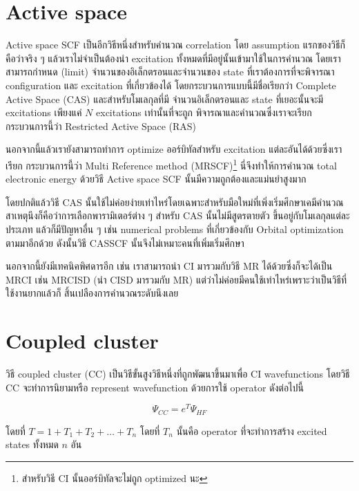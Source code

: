 \section{Active space}

Active space SCF เป็นอีกวิธีหนึ่งสำหรับคำนวณ correlation โดย assumption แรกของวิธีก็คือว่าจริง ๆ 
แล้วเราไม่จำเป็นต้องนำ excitation ทั้งหมดที่มีอยู่นั้นเข้ามาใช้ในการคำนวณ โดยเราสามารถกำหนด (limit) 
จำนวนของอิเล็กตรอนและจำนวนของ state ที่เราต้องการที่จะพิจารณา configuration และ excitation 
ที่เกี่ยวข้องได้ โดยกระบวนการแบบนี้มีชื่อเรียกว่า Complete Active Space (CAS) และสำหรับโมเลกุลที่มี%
จำนวนอิเล็กตรอนและ state ที่เยอะนั้นจะมี excitations เพียงแค่ $N$ excitations เท่านั้นที่จะถูก%
พิจารณาและคำนวณซึ่งเราจะเรียกกระบวนการนี้ว่า Restricted Active Space (RAS)

นอกจากนี้แล้วเรายังสามารถทำการ optimize ออร์บิทัลสำหรับ excitation แต่ละอันได้ด้วยซึ่งเราเรียก%
กระบวนการนี้ว่า Multi Reference method (MRSCF)\footnote{สำหรับวิธี CI นั้นออร์บิทัลจะไม่ถูก 
optimized นะ} นี่จึงทำให้การคำนวณ total electronic energy ด้วยวิธี Active space SCF 
นั้นมีความถูกต้องและแม่นยำสูงมาก

โดยปกติแล้ววิธี CAS นั้นใช้ไม่ค่อยง่ายเท่าไหร่โดยเฉพาะสำหรับมือใหม่ที่เพิ่งเริ่มศึกษาเคมีคำนวณ 
สาเหตุนึงก็คือว่าการเลือกพารามิเตอร์ต่าง ๆ สำหรับ CAS นั้นไม่มีสูตรตายตัว ขึ้นอยู่กับโมเลกุลแต่ละประเภท 
แล้วก็มีปัญหาอื่น ๆ เช่น numerical problems ที่เกี่ยวข้องกับ Orbital optimization ตามมาอีกด้วย 
ดังนั้นวิธี CASSCF นั้นจึงไม่เหมาะคนที่เพิ่มเริ่มศึกษา

นอกจากนี้ยังมีเทคนิคพิศดารอีก เช่น เราสามารถนำ CI มารวมกับวิธี MR ได้ด้วยซึ่งก็จะได้เป็น MRCI 
เช่น MRCISD (นำ CISD มารวมกับ MR) แต่ว่าไม่ค่อยมีคนใช้เท่าไหร่เพราะว่าเป็นวิธีที่ใช้งานยากแล้วก็%
สิ้นเปลืองการคำนวณระดับนึงเลย

\section{Coupled cluster}

วิธี coupled cluster (CC) เป็นวิธีขั้นสูงวิธีหนึ่งที่ถูกพัฒนาขึ้นมาเพื่อ CI wavefunctions 
โดยวิธี CC จะทำการนิยามหรือ represent wavefunction ด้วยการใช้ operator ดังต่อไปนี้

\begin{equation}
    \Psi_{CC} = e^{T} \Psi_{HF}
\end{equation}

\noindent โดยที่ $T = 1 + T_{1} + T_{2} + \dots + T_{n}$ โดยที่ $T_{n}$ นั้นคือ 
operator ที่จะทำการสร้าง excited states ทั้งหมด $n$ อัน 


